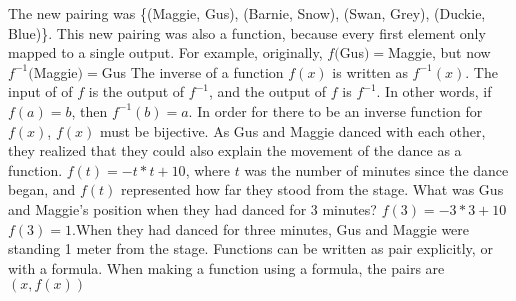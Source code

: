 {The new pairing was \{(Maggie, Gus), (Barnie, Snow), (Swan, Grey), (Duckie, Blue)\}. This new pairing was also a function, because every first element only mapped to a single output. For example, originally, $f($Gus$)= $Maggie, but now $f^{-1}($Maggie$) = $Gus}
{The inverse of a function $f(x)$ is written as $f^{-1}(x)$. The input of of $f$ is the output of $f^{-1}$, and the output of $f$ is $f^{-1}$. In other words, if $f(a)=b$, then $f^{-1}(b) = a$. In order for there to be an inverse function for $f(x)$, $f(x)$ must be bijective. }
{}
{As Gus and Maggie danced with each other, they realized that they could also explain the movement of the dance as a function. $f(t) = -t\ast t+10$, where $t$ was the number of minutes since the dance began, and $f(t)$ represented how far they stood from the stage. What was Gus and Maggie's position when they had danced for 3 minutes?}
{$f(3) = -3\ast 3 + 10$\linebreak $f(3)=1$.\linebreak When they had danced for three minutes, Gus and Maggie were standing 1 meter from the stage.}
{Functions can be written as pair explicitly, or with a formula. When making a function using a formula, the pairs are $(x, f(x))$}
{}
